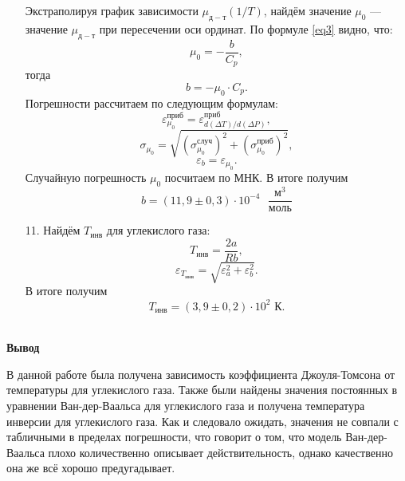 \documentclass[a4paper, 12pt]{article}
\begin{document}
\begin{enumerate}
        Экстраполируя график зависимости $\mu_{д-т}(1/T)$, найдём значение $\mu_0$ — значение $\mu_{д-т}$ при пересечении оси ординат. По формуле \eqref{eq3} видно, что:
        \begin{equation}
            \mu_0 = -\frac{b}{C_p},
        \end{equation}
        тогда
        \begin{equation}
            b = -\mu_0 \cdot C_p.
        \end{equation}
        Погрешности рассчитаем по следующим формулам:
        \begin{equation}
            \varepsilon_{\mu_0}^{приб} = \varepsilon_{d(\Delta T)/d(\Delta P)}^{приб},
        \end{equation}
        \begin{equation}
            \sigma_{\mu_0} = \sqrt{(\sigma_{\mu_0}^{случ})^2 + (\sigma_{\mu_0}^{приб})^2},
        \end{equation}
        \begin{equation}
            \varepsilon_b = \varepsilon_{\mu_0}.
        \end{equation}
        Случайную погрешность $\mu_0$ посчитаем по МНК. В итоге получим
        \begin{equation}
            b = (11,9 \pm 0,3) \cdot 10^{-4} \text{ } \frac{\text{м}^3}{\text{моль}}
        \end{equation}
        
        \item[11.] Найдём $T_{инв}$ для углекислого газа:
        \begin{equation}
            T_{инв} = \frac{2a}{R b},
        \end{equation}
        \begin{equation}
            \varepsilon_{T_{инв}} = \sqrt{\varepsilon_a^2 + \varepsilon_b^2}.
        \end{equation}
        В итоге получим
        \begin{equation}
            T_{инв} = (3,9 \pm 0,2) \cdot 10^2 \text{ К}.
        \end{equation}\\
    
    \end{enumerate}
    
    \begin{flushleft}
        {\Large {\bf Вывод}}
    \end{flushleft}
    
    В данной работе была получена зависимость коэффициента Джоуля-Томсона от температуры для углекислого газа. Также были найдены значения постоянных в уравнении Ван-дер-Ваальса для углекислого газа и получена температура инверсии для углекислого газа. Как и следовало ожидать, значения не совпали с табличными в пределах погрешности, что говорит о том, что модель Ван-дер-Ваальса плохо количественно описывает действительность, однако качественно она же всё хорошо предугадывает.
    
\end{document}
